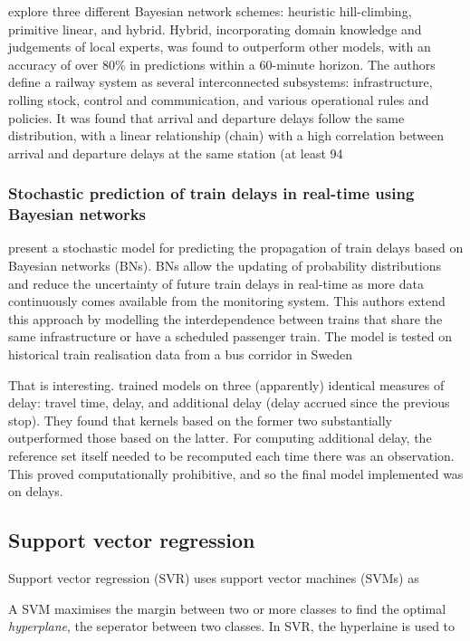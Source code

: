 \documentclass{article}
\begin{document}
explore three different Bayesian network schemes: heuristic hill-climbing, primitive linear, and hybrid. Hybrid, incorporating domain knowledge and judgements of local experts, was found to outperform other models, with an accuracy of over 80\% in predictions within a 60-minute horizon. The authors define a railway system as several interconnected subsystems: infrastructure, rolling stock, control and communication, and various operational rules and policies. 
It was found that arrival and departure delays follow the same distribution, with a linear relationship (chain) with a high correlation between arrival and departure delays at the same station (at least 94%

\subsubsection{Stochastic prediction of train delays in real-time using Bayesian networks \cite{corman_kecman_2018}}

present a stochastic model for predicting the propagation of train delays based on Bayesian networks (BNs). BNs allow the updating of probability distributions and reduce the uncertainty of future train delays in real-time as more data continuously comes available from the monitoring system. This authors extend this approach by modelling the interdependence between trains that share the same infrastructure or have a scheduled passenger train. The model is tested on historical train realisation data from a bus corridor in Sweden

That is interesting. \cite{nair_et_al_2019} trained models on three (apparently) identical measures of delay: travel time, delay, and additional delay (delay accrued since the previous stop). They found that kernels based on the former two substantially outperformed those based on the latter. For computing additional delay, the reference set itself needed to be recomputed each time there was an observation. This proved computationally prohibitive, and so the final model implemented was on delays.

\subsection{Support vector regression}

Support vector regression (SVR) uses support vector machines (SVMs) as

A SVM maximises the margin between two or more classes to find the optimal \textit{hyperplane}, the seperator between two classes. In SVR, the hyperlaine is used to 
\end{document}
